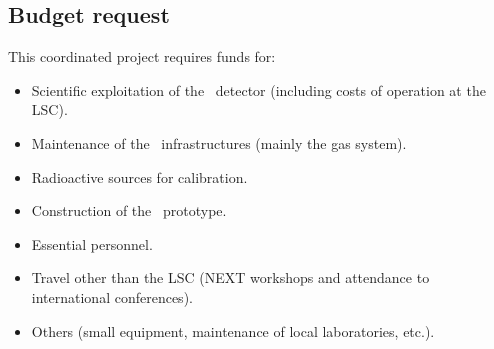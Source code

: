\subsection{Budget request}

%
%  
 
 This coordinated project requires funds for:
 \begin{itemize}[noitemsep,topsep=0pt,parsep=0pt,partopsep=0pt]
\item Scientific exploitation of the \Next\ detector (including costs of operation at the LSC). 
\item Maintenance of the \Next\ infrastructures (mainly the gas system). 
\item Radioactive sources for calibration. 
\item Construction of the \HDEMO\ prototype. 
\item Essential personnel. 
\item Travel other than the LSC (NEXT workshops and attendance to international conferences).
\item Others (small equipment, maintenance of local laboratories, etc.). 
\end{itemize}

